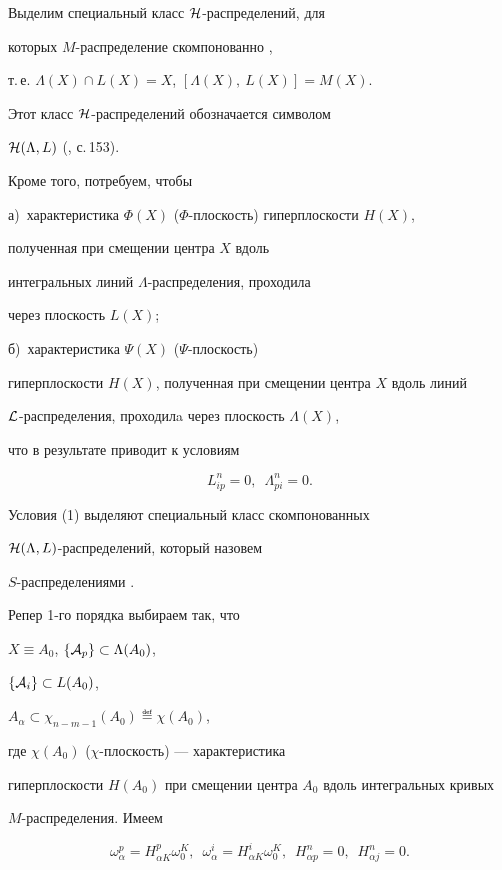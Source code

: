 Выделим специальный класс $\cal H$-распределений, для


которых $M$-распределение скомпонованно \cite{rab8},


т.\,е. $\Lambda(X)\cap L(X)=X$, $[\Lambda(X),\ L(X)]=M(X).$


Этот класс $\cal H$-распределений обозначается символом


${\cal H}(\Lambda, L)$ (\cite{rab1}, с.\,153).


Кроме того, потребуем, чтобы


а)~характеристика $\Phi(X)$ ($\Phi$-плоскость) гиперплоскости $H(X)$,


полученная при смещении центра $X$ вдоль


интегральных линий $\Lambda$-распределения, проходила


через плоскость $L(X)$;


б)~характеристика $\Psi(X)$ ($\Psi$-плоскость)


гиперплоскости $H(X)$, полученная при смещении центра $X$ вдоль линий


$\cal L$-распределения, проходилa через плоскость $\Lambda(X)$,


что в результате приводит к условиям


\begin{equation}


L^n_{ip}=0,\ \; \Lambda^n_{pi}=0.


\end{equation}


Условия (1) выделяют специальный класс скомпонованных


${\cal H}(\Lambda, L)$-распределений, который назовем


$S$-распределениями \cite{rab2}.





Репер 1-го порядка выбираем так, что


$X\equiv A_0$, $\{{\cal A}_p\}\subset\Lambda(A_0)$,


$\{{\cal A}_i\}\subset L(A_0)$,


$A_\alpha\subset\chi_{n-m-1}(A_0)\eqdef\chi(A_0)$,


где $\chi(A_0)$ ($\chi$-плоскость) --- характеристика


гиперплоскости $H(A_0)$ при смещении центра $A_0$ вдоль интегральных кривых


$M$-распределения. Имеем


\begin{equation}


\omega^p_\alpha=H^p_{\alpha K}\omega^K_0 , \ \;


\omega^i_\alpha=H^i_{\alpha K}\omega^K_0 , \ \;


H^n_{\alpha p}=0 , \ \;


H^n_{\alpha j}=0 .


\end{equation}


